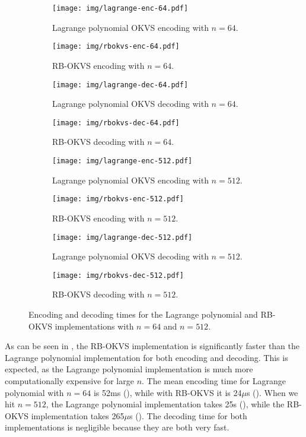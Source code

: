 \begin{figure}
	\begin{subfigure}{.5\textwidth}
		\centering
		\texttt{[image: img/lagrange-enc-64.pdf]}
		\caption{Lagrange polynomial OKVS encoding with $n=64$.}
		\label{fig:lagrange-enc-64}
	\end{subfigure}%
	\begin{subfigure}{.5\textwidth}
		\centering
		\texttt{[image: img/rbokvs-enc-64.pdf]}
		\caption{RB-OKVS encoding with $n=64$.}
		\label{fig:rbokvs-enc-64}
	\end{subfigure}
	\begin{subfigure}{.5\textwidth}
		\centering
		\texttt{[image: img/lagrange-dec-64.pdf]}
		\caption{Lagrange polynomial OKVS decoding with $n=64$.}
	\end{subfigure}%
	\begin{subfigure}{.5\textwidth}
		\centering
		\texttt{[image: img/rbokvs-dec-64.pdf]}
		\caption{RB-OKVS decoding with $n=64$.}
	\end{subfigure}
	\begin{subfigure}{.5\textwidth}
		\centering
		\texttt{[image: img/lagrange-enc-512.pdf]}
		\caption{Lagrange polynomial OKVS encoding with $n=512$.}
		\label{fig:lagrange-enc-512}
	\end{subfigure}%
	\begin{subfigure}{.5\textwidth}
		\centering
		\texttt{[image: img/rbokvs-enc-512.pdf]}
		\caption{RB-OKVS encoding with $n=512$.}
		\label{fig:rbokvs-enc-512}
	\end{subfigure}
	\begin{subfigure}{.5\textwidth}
		\centering
		\texttt{[image: img/lagrange-dec-512.pdf]}
		\caption{Lagrange polynomial OKVS decoding with $n=512$.}
	\end{subfigure}%
	\begin{subfigure}{.5\textwidth}
		\centering
		\texttt{[image: img/rbokvs-dec-512.pdf]}
		\caption{RB-OKVS decoding with $n=512$.}
	\end{subfigure}
	\caption{Encoding and decoding times for the Lagrange polynomial and RB-OKVS implementations with $n=64$ and $n=512$.}
	\label{fig:okvs-benchmarks}
\end{figure}

As can be seen in , the RB-OKVS implementation is significantly faster than the Lagrange polynomial implementation for both encoding and decoding. This is expected, as the Lagrange polynomial implementation is much more computationally expensive for large $n$. The mean encoding time for Lagrange polynomial with $n=64$ is 52ms (), while with RB-OKVS it is 24$\mu$s (). When we hit $n=512$, the Lagrange polynomial implementation takes 25s (), while the RB-OKVS implementation takes 265$\mu$s (). The decoding time for both implementations is negligible because they are both very fast.


